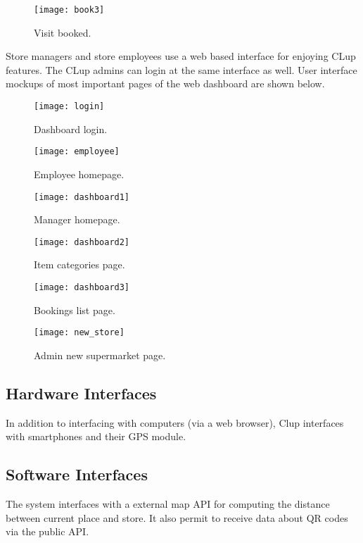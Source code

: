 \vspace{1cm}

\begin{figure}[H]
	\centering
	\texttt{[image: book3]}
	\caption{Visit booked.}
\end{figure}

\clearpage

Store managers and store employees use a web based interface for enjoying CLup features. The CLup admins can login at the same interface as well.
User interface mockups of most important pages of the web dashboard are shown below.
\vspace{0.5cm}
\begin{figure}[H]
	\centering
	\texttt{[image: login]}
	\caption{Dashboard login.}
\end{figure}
\begin{figure}[H]
	\centering
	\texttt{[image: employee]}
	\caption{Employee homepage.}
\end{figure}
\begin{figure}[H]
	\centering
	\texttt{[image: dashboard1]}
	\caption{Manager homepage.}
\end{figure}
\begin{figure}[H]
	\centering
	\texttt{[image: dashboard2]}
	\caption{Item categories page.}
\end{figure}
\begin{figure}[H]
	\centering
	\texttt{[image: dashboard3]}
	\caption{Bookings list page.}
\end{figure}
\begin{figure}[H]
	\centering
	\texttt{[image: new\_store]}
	\caption{Admin new supermarket page.}
\end{figure}

\clearpage

\subsection{Hardware Interfaces}
In addition to interfacing with computers (via a web browser), Clup interfaces with smartphones and their GPS module.
\subsection{Software Interfaces}
The system interfaces with a external map API for computing the distance between current place and store. It also permit to receive data
about QR codes via the public API.

